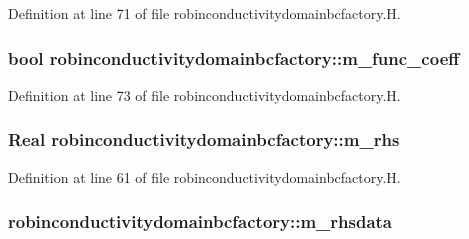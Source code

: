 Definition at line 71 of file robinconductivitydomainbcfactory.\+H.

\subsubsection[{\texorpdfstring{m\+\_\+func\+\_\+coeff}{m_func_coeff}}]{\setlength{\rightskip}{0pt plus 5cm}bool robinconductivitydomainbcfactory\+::m\+\_\+func\+\_\+coeff\hspace{0.3cm}{\ttfamily [protected]}}\hypertarget{classrobinconductivitydomainbcfactory_a12f7cf84405d4b2e63cb196512d192cf}{}\label{classrobinconductivitydomainbcfactory_a12f7cf84405d4b2e63cb196512d192cf}


Definition at line 73 of file robinconductivitydomainbcfactory.\+H.

\subsubsection[{\texorpdfstring{m\+\_\+rhs}{m_rhs}}]{\setlength{\rightskip}{0pt plus 5cm}Real robinconductivitydomainbcfactory\+::m\+\_\+rhs\hspace{0.3cm}{\ttfamily [protected]}}\hypertarget{classrobinconductivitydomainbcfactory_a078909aca7ef8f1a4986f72a4dc563a1}{}\label{classrobinconductivitydomainbcfactory_a078909aca7ef8f1a4986f72a4dc563a1}


Definition at line 61 of file robinconductivitydomainbcfactory.\+H.

\subsubsection[{\texorpdfstring{m\+\_\+rhsdata}{m_rhsdata}}]{ robinconductivitydomainbcfactory\+::m\+\_\+rhsdata\hspace{0.3cm}{\ttfamily [protected]}}\hypertarget{classrobinconductivitydomainbcfactory_a15254f11bce4b7c30bfa87b7f7780398}{}\label{classrobinconductivitydomainbcfactory_a15254f11bce4b7c30bfa87b7f7780398}


